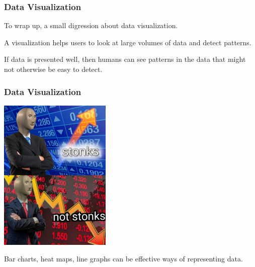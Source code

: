 \begin{frame}
\frametitle{Data Visualization}

To wrap up, a small digression about data visualization. 

A visualization helps users to look at large volumes of data and detect patterns. 

If data is presented well, then humans can see patterns in the data that might not otherwise be easy to detect. 
\end{frame}

\begin{frame}
\frametitle{Data Visualization}

\begin{center}
	\includegraphics[width=0.4\textwidth]{images/stonks.jpg}
\end{center}

Bar charts, heat maps, line graphs can be effective ways of representing data.

\end{frame}






